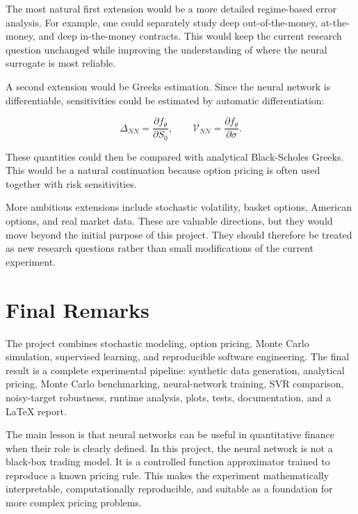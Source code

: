 The most natural first extension would be a more detailed regime-based error analysis.
For example, one could separately study deep out-of-the-money, at-the-money, and deep in-the-money contracts.
This would keep the current research question unchanged while improving the understanding of where the neural surrogate is most reliable.

A second extension would be Greeks estimation.
Since the neural network is differentiable, sensitivities could be estimated by automatic differentiation:

\begin{equation}
    \Delta_{NN}
    =
    \frac{\partial f_\theta}{\partial S_0},
    \qquad
    \mathcal{V}_{NN}
    =
    \frac{\partial f_\theta}{\partial \sigma}.
\end{equation}

These quantities could then be compared with analytical Black-Scholes Greeks.
This would be a natural continuation because option pricing is often used together with risk sensitivities.

More ambitious extensions include stochastic volatility, basket options, American options, and real market data.
These are valuable directions, but they would move beyond the initial purpose of this project.
They should therefore be treated as new research questions rather than small modifications of the current experiment.

\section{Final Remarks}

The project combines stochastic modeling, option pricing, Monte Carlo simulation, supervised learning, and reproducible software engineering.
The final result is a complete experimental pipeline: synthetic data generation, analytical pricing, Monte Carlo benchmarking, neural-network training, SVR comparison, noisy-target robustness, runtime analysis, plots, tests, documentation, and a \LaTeX{} report.

The main lesson is that neural networks can be useful in quantitative finance when their role is clearly defined.
In this project, the neural network is not a black-box trading model.
It is a controlled function approximator trained to reproduce a known pricing rule.
This makes the experiment mathematically interpretable, computationally reproducible, and suitable as a foundation for more complex pricing problems.
